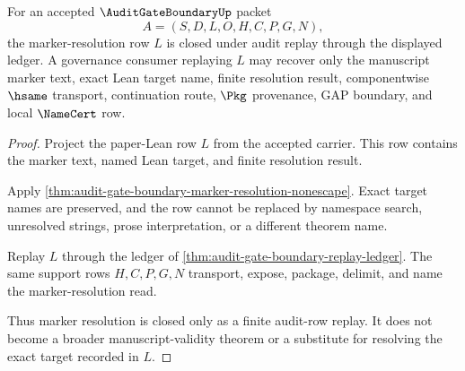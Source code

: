 \begin{theorem}
\label{thm:audit-gate-boundary-marker-resolution-closure}
For an accepted $\AuditGateBoundaryUp$ packet
$$
A=(S,D,L,O,H,C,P,G,N),
$$
the marker-resolution row $L$ is closed under audit replay through the displayed ledger. A governance consumer replaying $L$ may recover only the manuscript marker text, exact Lean target name, finite resolution result, componentwise $\hsame$ transport, continuation route, $\Pkg$ provenance, GAP boundary, and local $\NameCert$ row.
\end{theorem}
\begin{proof}
Project the paper-Lean row $L$ from the accepted carrier. This row contains the marker text, named Lean target, and finite resolution result.

Apply \autoref{thm:audit-gate-boundary-marker-resolution-nonescape}. Exact target names are preserved, and the row cannot be replaced by namespace search, unresolved strings, prose interpretation, or a different theorem name.

Replay $L$ through the ledger of \autoref{thm:audit-gate-boundary-replay-ledger}. The same support rows $H,C,P,G,N$ transport, expose, package, delimit, and name the marker-resolution read.

Thus marker resolution is closed only as a finite audit-row replay. It does not become a broader manuscript-validity theorem or a substitute for resolving the exact target recorded in $L$.
\end{proof}

